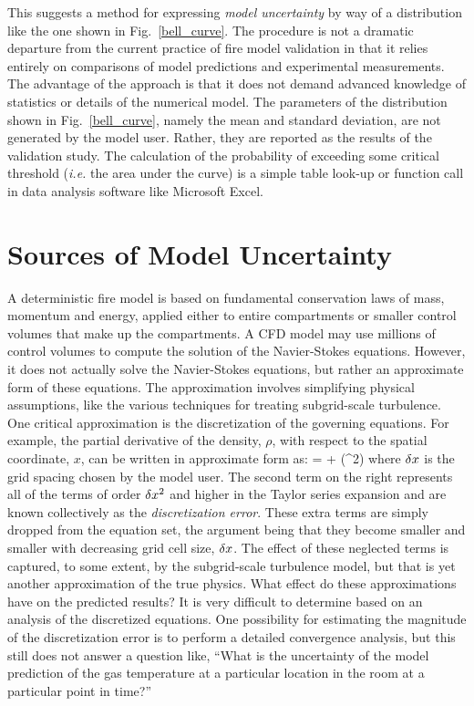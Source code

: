 This \paper suggests a method for expressing {\em model uncertainty} by way of a distribution like the one shown in Fig.~\ref{bell_curve}.
The procedure is not a dramatic departure from the current
practice of fire model validation in that it relies entirely on comparisons of model predictions and experimental measurements. The advantage of
the approach is that it does not demand advanced knowledge of statistics or details of the numerical model. The parameters of the distribution shown in
Fig.~\ref{bell_curve}, namely the mean and standard deviation, are not generated by the model user. Rather, they are reported as the results of the
validation study. The calculation of the probability of exceeding some critical threshold ({\em i.e.} the area under the curve) is a simple
table look-up or function call in data analysis software like Microsoft Excel\textregistered.



\section{Sources of Model Uncertainty}

A deterministic fire model is based on fundamental conservation laws of mass, momentum and energy,
applied either to entire compartments or smaller control
volumes that make up the compartments. A CFD model may use millions of control volumes to compute the
solution of the Navier-Stokes equations.
However, it does not actually solve the Navier-Stokes equations, but rather an approximate form of these equations.
The approximation involves simplifying
physical assumptions, like the various techniques for treating subgrid-scale turbulence.
One critical approximation is the discretization of the governing equations. For example,
the partial derivative of the density, $\rho$,
with respect to the spatial coordinate, $x$, can be written in approximate form as:
\be {} =  + (\dx^2) \ee
where $\delta x$ is the grid spacing chosen by the model user.
The second term on the right represents all of the terms of order $\delta x^2$ and higher in the Taylor
series expansion and are known collectively as the
{\em discretization error}. These extra terms are simply dropped from
the equation set, the argument being that they become smaller and smaller with decreasing grid cell size, $\delta x$.
The effect of these neglected terms is captured, to
some extent, by the subgrid-scale turbulence model, but that is yet another approximation of the true physics.
What effect do these approximations have on
the predicted results? It is very difficult to determine based on an analysis of the discretized equations.
One possibility for estimating
the magnitude of the discretization error is to perform a detailed
convergence analysis, but this still does not answer a
question like, ``What is the uncertainty of the model prediction of the gas
temperature at a particular location in the room at a particular point in time?''

